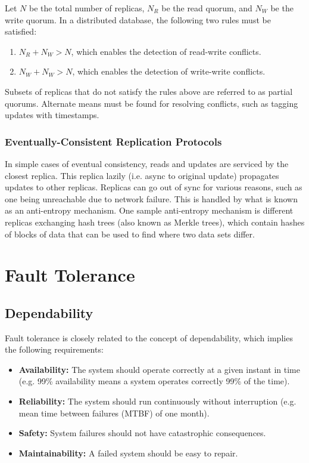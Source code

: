 \documentclass[12pt,titlepage]{article}
\begin{document}
        Let $N$ be the total number of replicas, $N_R$ be the read quorum, and $N_W$ be the write quorum. In a distributed database, the following two rules must
        be satisfied:
        \begin{enumerate}
          \item $N_R + N_W > N$, which enables the detection of read-write conflicts.
          \item $N_W + N_W > N$, which enables the detection of write-write conflicts.
        \end{enumerate}

        Subsets of replicas that do not satisfy the rules above are referred to as partial quorums. Alternate means must be found for resolving conflicts, such
        as tagging updates with timestamps.

      \subsubsection{Eventually-Consistent Replication Protocols}
        In simple cases of eventual consistency, reads and updates are serviced by the closest replica. This replica lazily (i.e. async to original update) propagates
        updates to other replicas. Replicas can go out of sync for various reasons, such as one being unreachable due to network failure. This is handled by what is
        known as an anti-entropy mechanism. One sample anti-entropy mechanism is different replicas exchanging hash trees (also known as Merkle trees), which contain
        hashes of blocks of data that can be used to find where two data sets differ.

  \newpage

  \section{Fault Tolerance}

    \subsection{Dependability}
      Fault tolerance is closely related to the concept of dependability, which implies the following requirements:
      \begin{itemize}
        \item \textbf{Availability:} The system should operate correctly at a given instant in time (e.g. 99\% availability means a system operates
          correctly 99\% of the time).
        \item \textbf{Reliability:} The system should run continuously without interruption (e.g. mean time between failures (MTBF) of one month).
        \item \textbf{Safety:} System failures should not have catastrophic consequences.
        \item \textbf{Maintainability:} A failed system should be easy to repair.
      \end{itemize}
\end{document}
